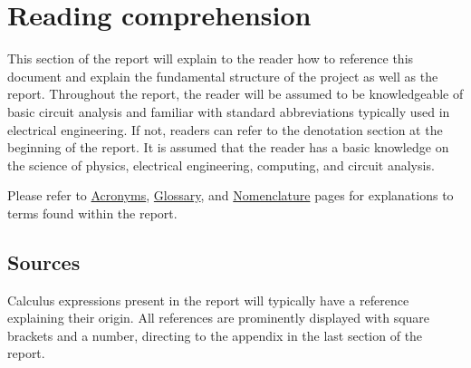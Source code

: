 \chapter*{Reading comprehension} \label{cha:report_structure}
This section of the report will explain to the reader how to reference this document and explain the fundamental structure of the project as well as the report. Throughout the report, the reader will be assumed to be knowledgeable of basic circuit analysis and familiar with standard abbreviations typically used in electrical engineering. If not, readers can refer to the denotation section at the beginning of the report. It is assumed that the reader has a basic knowledge on the science of physics, electrical engineering, computing, and circuit analysis.

Please refer to \hyperref[cha:acronyms]{Acronyms}, \hyperref[cha:glossary]{Glossary}, and \hyperref[cha:nomenclature]{Nomenclature} pages for explanations to terms found within the report.


\section*{Sources}
Calculus expressions present in the report will typically have a reference explaining their origin. All references are prominently displayed with square brackets and a number, directing to the appendix in the last section of the report.

